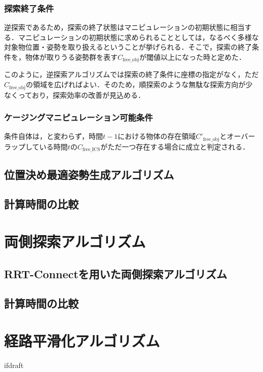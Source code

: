 \documentclass[a4paper,twoside,12pt,papersize, dvipdfmx]{iirthesis}
\begin{document}
\subsubsection{探索終了条件}
逆探索であるため，探索の終了状態はマニピュレーションの初期状態に相当する．マニピュレーションの初期状態に求められることとしては，なるべく多様な対象物位置・姿勢を取り扱えるということが挙げられる．そこで，探索の終了条件を，物体が取りうる姿勢群を表す$C_{\mathrm{free\_obj}}$が閾値以上になった時と定めた．\par
このように，逆探索アルゴリズムでは探索の終了条件に座標の指定がなく，ただ$C_{\mathrm{free\_obj}}$の領域を広げればよい．そのため，順探索のような無駄な探索方向が少なくっており，探索効率の改善が見込める．

\subsubsection{ケージングマニピュレーション可能条件}
条件自体は，と変わらず，時間$t-1$における物体の存在領域$C'_{\mathrm{free\_obj}}$とオーバーラップしている時間$t$の$C_{\mathrm{free\_ICS}}$がただ一つ存在する場合に成立と判定される．

\subsection{位置決め最適姿勢生成アルゴリズム}
\subsection{計算時間の比較}


\section{両側探索アルゴリズム}
\subsection{RRT-Connectを用いた両側探索アルゴリズム}
\subsection{計算時間の比較}

\section{経路平滑化アルゴリズム}



\expandafter\ifx\csname ifdraft\endcsname\relax
    
\end{document}
